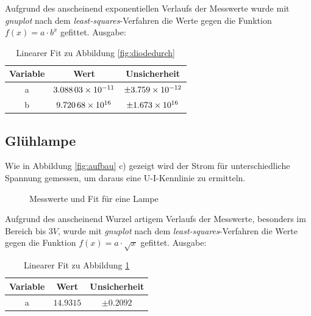 Aufgrund des anscheinend exponentiellen Verlaufs der Messwerte wurde mit \emph{gnuplot} nach dem \emph{least-squares}-Verfahren die Werte gegen die Funktion $f(x)=a\cdot b^x$ gefittet. Ausgabe:
\begin{table}[H]
  \centering
  \begin{tabular}{c | c | c }
    Variable & Wert & Unsicherheit\\ \hline
    a & $\num{3.08803d-11}$ & $\pm\num{3.759d-12}$ \\
    b & $\num{9,72068d16}$ & $\pm\num{1.673d16}$
  \end{tabular}
  \caption{Linearer Fit zu Abbildung \ref{fig:diodedurch}}
  \label{tab:fitdiodedurch}
\end{table}
\subsection{Glühlampe}
Wie in Abbildung \ref{fig:aufbau} c) gezeigt wird der Strom für unterschiedliche Spannung gemessen, um daraus eine U-I-Kennlinie zu ermitteln.

\begin{figure}[H]
\centering
{}
\caption{Messwerte und Fit für eine Lampe}
\label{fig:Lampe}
\end{figure}
Aufgrund des anscheinend Wurzel artigem Verlaufs der Messwerte, besonders im Bereich bis $3V$, wurde mit \emph{gnuplot} nach dem \emph{least-squares}-Verfahren die Werte gegen die Funktion $f(x)=a\cdot\sqrt{x}$ gefittet. Ausgabe:
\begin{table}[H]
  \centering
  \begin{tabular}{c | c | c }
    Variable & Wert & Unsicherheit\\ \hline
    a & $\num{14,9315}$ & $\pm\num{0,2092}$ \\
   
  \end{tabular}
  \caption{Linearer Fit zu Abbildung \ref{fig:Lampe}}
  \label{tab:fitlampe}
\end{table}
